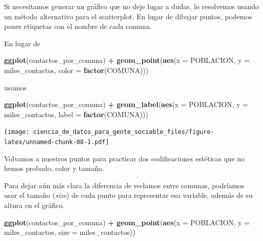 \documentclass[spanish,]{book}
\newenvironment{Shaded}{\begin{snugshade}}{\end{snugshade}}
\newcommand{\DataTypeTok}[1]{\textcolor[rgb]{0.13,0.29,0.53}{#1}}
\newcommand{\KeywordTok}[1]{\textcolor[rgb]{0.13,0.29,0.53}{\textbf{#1}}}
\newcommand{\NormalTok}[1]{#1}
\newcommand{\OperatorTok}[1]{\textcolor[rgb]{0.81,0.36,0.00}{\textbf{#1}}}
\newcommand{\StringTok}[1]{\textcolor[rgb]{0.31,0.60,0.02}{#1}}
\begin{document}
Si necesitamos generar un gráfico que no deje lugar a dudas, lo resolvemos usando un método alternativo para el scatterplot. En lugar de dibujar puntos, podemos poner etiquetas con el nombre de cada comuna.

En lugar de

\begin{Shaded}
\begin{Highlighting}[]
\KeywordTok{ggplot}\NormalTok{(contactos_por_comuna) }\OperatorTok{+}\StringTok{ }
\StringTok{    }\KeywordTok{geom_point}\NormalTok{(}\KeywordTok{aes}\NormalTok{(}\DataTypeTok{x =}\NormalTok{ POBLACION, }\DataTypeTok{y =}\NormalTok{ miles_contactos, }\DataTypeTok{color =} \KeywordTok{factor}\NormalTok{(COMUNA)))}
\end{Highlighting}
\end{Shaded}

usamos

\begin{Shaded}
\begin{Highlighting}[]
\KeywordTok{ggplot}\NormalTok{(contactos_por_comuna) }\OperatorTok{+}
\StringTok{    }\KeywordTok{geom_label}\NormalTok{(}\KeywordTok{aes}\NormalTok{(}\DataTypeTok{x =}\NormalTok{ POBLACION, }\DataTypeTok{y =}\NormalTok{ miles_contactos, }\DataTypeTok{label =} \KeywordTok{factor}\NormalTok{(COMUNA)))}
\end{Highlighting}
\end{Shaded}

\texttt{[image: ciencia\_de\_datos\_para\_gente\_sociable\_files/figure-latex/unnamed-chunk-88-1.pdf]}

Volvamos a nuestros puntos para practicar dos codificaciones estéticas que no hemos probado, color y tamaño.

Para dejar aún más clara la diferencia de reclamos entre comunas, podríamos usar el tamaño (\emph{size}) de cada punto para representar esa variable, además de su altura en el gráfico.

\begin{Shaded}
\begin{Highlighting}[]
\KeywordTok{ggplot}\NormalTok{(contactos_por_comuna) }\OperatorTok{+}\StringTok{ }
\StringTok{    }\KeywordTok{geom_point}\NormalTok{(}\KeywordTok{aes}\NormalTok{(}\DataTypeTok{x =}\NormalTok{ POBLACION, }\DataTypeTok{y =}\NormalTok{ miles_contactos, }\DataTypeTok{size =}\NormalTok{ miles_contactos))}
\end{Highlighting}
\end{Shaded}
\end{document}
